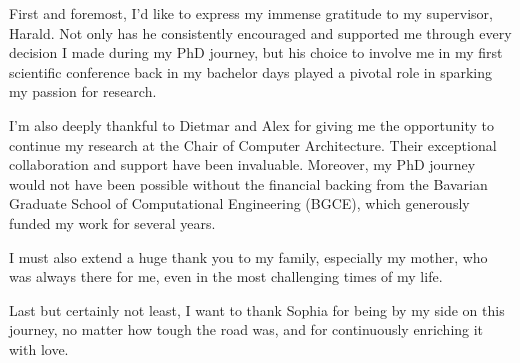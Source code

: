 First and foremost, I’d like to express my immense gratitude to my supervisor, Harald. Not only has he consistently encouraged and supported me through every decision I made during my PhD journey, but his choice to involve me in my first scientific conference back in my bachelor days played a pivotal role in sparking my passion for research.

I’m also deeply thankful to Dietmar and Alex for giving me the opportunity to continue my research at the Chair of Computer Architecture. Their exceptional collaboration and support have been invaluable. Moreover, my PhD journey would not have been possible without the financial backing from the Bavarian Graduate School of Computational Engineering (BGCE), which generously funded my work for several years.

I must also extend a huge thank you to my family, especially my mother, who was always there for me, even in the most challenging times of my life.

Last but certainly not least, I want to thank Sophia for being by my side on this journey, no matter how tough the road was, and for continuously enriching it with love.